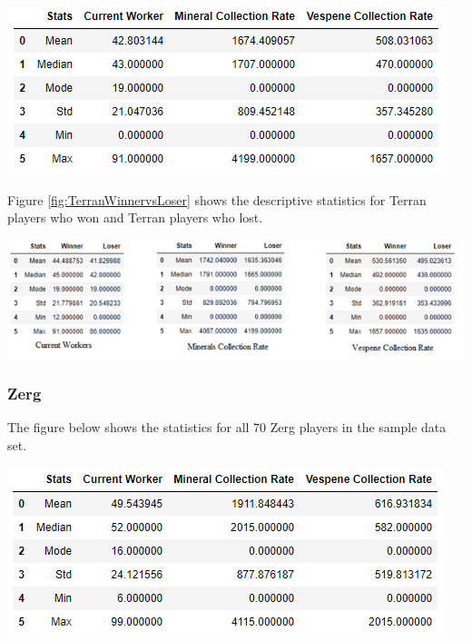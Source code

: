 \documentclass[a4paper,12pt]{report}
\begin{document}
\begin{center}
    \captionsetup{type=figure}
    \includegraphics[width=.9\linewidth]{media/TerranDescriptive.png}
\end{center}

Figure \ref{fig:TerranWinnervsLoser} shows the descriptive statistics for Terran players who won and Terran players who lost. 

\begin{center}
    \captionsetup{type=figure}
    \includegraphics[width=.9\linewidth]{media/TerranWinnervsLoser.png}
    \label{fig:TerranWinnervsLoser}
\end{center}

\subsubsection{Zerg}
The figure below shows the statistics for all 70 Zerg players in the sample data set. 

\begin{center}
    \captionsetup{type=figure}
    \includegraphics[width=.9\linewidth]{media/ZergDescriptive.png}
\end{center}
\end{document}
